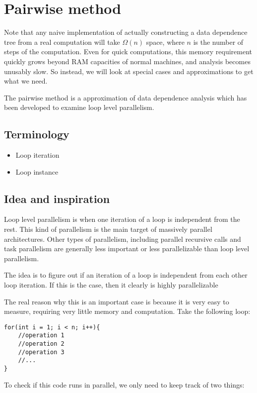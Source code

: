 \documentclass[12pt,twoside]{reedthesis}
\begin{document}
	\section{Pairwise method}

		Note that any naive implementation of actually constructing a data dependence tree from a real computation will take $\Omega(n)$ space, where $n$ is the number of steps of the computation. Even for quick computations, this memory requirement quickly grows beyond RAM capacities of normal machines, and analysis becomes unusably slow. So instead, we will look at special cases and approximations to get what we need.

		The pairwise method is a approximation of data dependence analysis which has been developed to examine loop level parallelism.

		\subsection{Terminology}
		\begin{itemize}
			\item Loop iteration
			\item Loop instance
		\end{itemize}

		\subsection{Idea and inspiration}

		Loop level parallelism is when one iteration of a loop is independent from the rest. This kind of parallelism is the main target of massively parallel architectures. Other types of parallelism, including parallel recursive calls and task parallelism are generally less important or less parallelizable than loop level parallelism.

		The idea is to figure out if an iteration of a loop is independent from each other loop iteration. If this is the case, then it clearly is highly parallelizable

		The real reason why this is an important case is because it is very easy to measure, requiring very little memory and computation. Take the following loop:
\begin{lstlisting}
for(int i = 1; i < n; i++){
	//operation 1
	//operation 2
	//operation 3
	//...
}
\end{lstlisting}


		To check if this code runs in parallel, we only need to keep track of two things:
\end{document}
